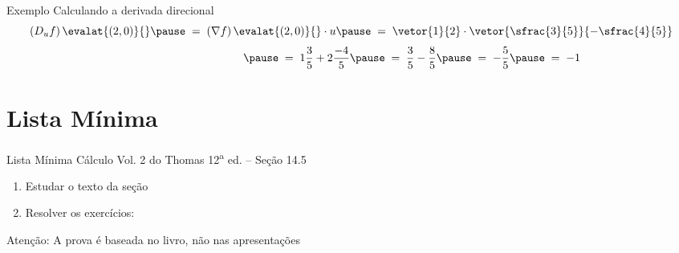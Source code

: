 \begin{frame}{Exemplo \theexemplo}
  Calculando a derivada direcional
  \[
    \left(D_u f\right)\evalat{(2, 0)}{}
    \pause
    \;=\; \left(\nabla f\right)\evalat{(2, 0)}{} \cdot u
    \pause
    \;=\; \vetor{1}{2} \cdot \vetor{\sfrac{3}{5}}{-\sfrac{4}{5}}
  \]
  \[
    \hphantom{\left(D_u f\right)\evalat{(2, 0)}{}}
    \pause
    \;=\; 1 \frac{3}{5} + 2 \frac{-4}{5}
    \pause
    \;=\; \frac{3}{5} - \frac{8}{5}
    \pause
    \;=\; - \frac{5}{5}
    \pause
    \;=\; -1
  \]
\end{frame}

\section{Lista Mínima}

\begin{frame}{Lista Mínima}
  Cálculo Vol. 2 do Thomas 12\textsuperscript{a} ed. -- Seção 14.5
  \begin{enumerate}
    \item Estudar o texto da seção
    \item Resolver os exercícios: 
  \end{enumerate}

  \vfill
  Atenção: A prova é baseada no livro, não nas apresentações
\end{frame}


